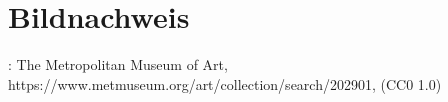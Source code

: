\chapter*{Bildnachweis}

: The Metropolitan Museum of Art,\\
https://www.metmuseum.org/art/collection/search/202901, (CC0 1.0)